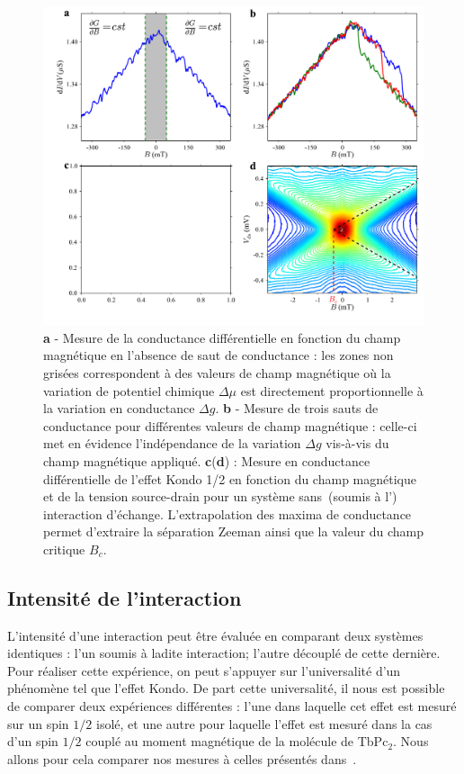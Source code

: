 \begin{figure}
\includegraphics[scale=0.45]{Resultats/AmplJump/AmplJump.pdf} 
\caption{\textbf{a} - Mesure de la conductance différentielle en fonction du champ magnétique en l'absence de saut de conductance : les zones non grisées correspondent à des valeurs de champ magnétique où la variation de potentiel chimique $\Delta \mu$ est directement proportionnelle à la variation en conductance $\Delta g$. \textbf{b} - Mesure de trois sauts de conductance pour différentes valeurs de champ magnétique : celle-ci met en évidence l'indépendance de la variation $\Delta g$ vis-à-vis du champ magnétique appliqué. \textbf{c}(\textbf{d}) : Mesure en conductance différentielle de l'effet Kondo 1/2 en fonction du champ magnétique et de la tension source-drain pour un système sans~(soumis à l') interaction d'échange. L'extrapolation des maxima de conductance permet d'extraire la séparation Zeeman ainsi que la valeur du champ critique $B_c$.}
\label{analyse_interaction}
\end{figure}

\subsection{Intensité de l'interaction}
L'intensité d'une interaction peut être évaluée en comparant deux systèmes identiques : l'un soumis à ladite interaction; l'autre découplé de cette dernière. Pour réaliser cette expérience, on peut s'appuyer sur l'universalité d'un phénomène tel que l'effet Kondo. De part cette universalité, il nous est possible de comparer deux expériences différentes : l'une dans laquelle cet effet est mesuré sur un spin $1/2$ isolé, et une autre pour laquelle l'effet est mesuré dans la cas d'un spin $1/2$ couplé au moment magnétique de la molécule de TbPc$_2$. Nous allons pour cela comparer nos mesures à celles présentés dans~\cite{Roch2009}.

